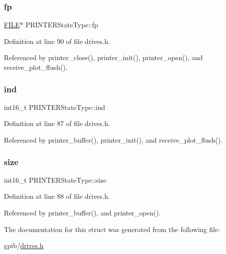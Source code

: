 \subsubsection{\texorpdfstring{fp}{fp}}
{\footnotesize\ttfamily \hyperlink{posix_8h_aed4dabeb9f7c518ded42f930a04abce8}{F\+I\+LE}$\ast$ P\+R\+I\+N\+T\+E\+R\+State\+Type\+::fp}



Definition at line 90 of file drives.\+h.



Referenced by printer\+\_\+close(), printer\+\_\+init(), printer\+\_\+open(), and receive\+\_\+plot\+\_\+flush().

\mbox{\label{structPRINTERStateType_a7d8873d0011f31d7dd00c2b7e0d362bd}} 
\subsubsection{\texorpdfstring{ind}{ind}}
{\footnotesize\ttfamily int16\+\_\+t P\+R\+I\+N\+T\+E\+R\+State\+Type\+::ind}



Definition at line 87 of file drives.\+h.



Referenced by printer\+\_\+buffer(), printer\+\_\+init(), and receive\+\_\+plot\+\_\+flush().

\mbox{\label{structPRINTERStateType_ac6d8323e47879ed58e7fa2cc7cfd7c30}} 
\subsubsection{\texorpdfstring{size}{size}}
{\footnotesize\ttfamily int16\+\_\+t P\+R\+I\+N\+T\+E\+R\+State\+Type\+::size}



Definition at line 88 of file drives.\+h.



Referenced by printer\+\_\+buffer(), and printer\+\_\+open().



The documentation for this struct was generated from the following file\+:\begin{DoxyCompactItemize}
\item 
gpib/\hyperlink{drives_8h}{drives.\+h}\end{DoxyCompactItemize}
